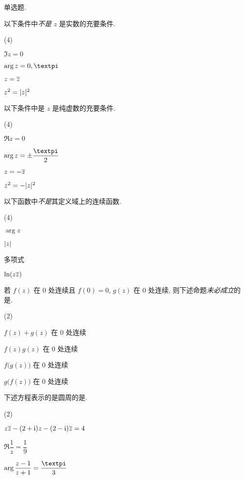 \begin{homework}
  \item 单选题.
  \begin{homework}
    \item 以下条件中\fillbrace{}\emph{不是} $z$ 是实数的充要条件.
    \begin{exchoice}(4)
      \item $\Im z=0$
      \item $\arg z=0,\cpi$
      \item $z=\overline z$
      \item $z^2=\lvert z\rvert^2$
    \end{exchoice}
    \item 以下条件中\fillbrace{}是 $z$ 是纯虚数的充要条件.
    \begin{exchoice}(4)
      \item $\Re z=0$
      \item $\arg z=\pm\dfrac\cpi2$
      \item $z=-\overline z$
      \item $z^2=-\lvert z\rvert^2$
    \end{exchoice}
    \item 以下函数中\fillbrace{}\emph{不是}其定义域上的连续函数.
    \begin{exchoice}(4)
      \item $\arg z$
      \item $\lvert z\rvert$
      \item 多项式
      \item $\ln(z\overline z)$
    \end{exchoice}
    \item 若 $f(z)$ 在 $0$ 处连续且 $f(0)=0$, $g(z)$ 在 $0$ 处连续, 则下述命题\emph{未必成立}的是\fillbrace{}.
    \begin{exchoice}(2)
      \item $f(z)+g(z)$ 在 $0$ 处连续
      \item $f(z)g(z)$ 在 $0$ 处连续
      \item $f\bigl(g(z)\bigr)$ 在 $0$ 处连续
      \item $g\bigl(f(z)\bigr)$ 在 $0$ 处连续
    \end{exchoice}
    \item 下述方程表示的是圆周的是\fillbrace{}.
    \begin{exchoice}(2)
      \item $z\overline z-(2+\mathrm{i})z-(2-\mathrm{i})\overline z=4$
      \item $\Re\dfrac{1}{z}=\dfrac{1}{9}$
      \item $\arg\dfrac{z-1}{z+1}=\dfrac{\cpi}{3}$

\end{exchoice}
\end{homework}
\end{homework}
